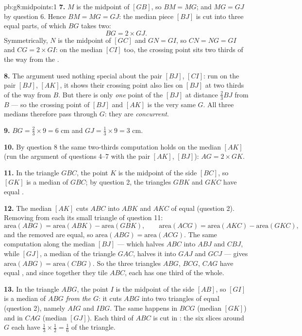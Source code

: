\begin{solution}{pb:g8:midpoints:1}
\textbf{7.} $M$ is the midpoint of $[GB]$, so $BM = MG$; and
$MG = GJ$ by question 6. Hence $BM = MG = GJ$: the median piece
$[BJ]$ is cut into three equal parts, of which $BG$ takes two:
\[
BG = 2 \times GJ .
\]
Symmetrically, $N$ is the midpoint of $[GC]$ and $GN = GI$, so
$CN = NG = GI$ and $CG = 2 \times GI$: on the median $[CI]$ too,
the crossing point sits two thirds of the way from the .

\textbf{8.} The argument used nothing special about the pair
$[BJ]$, $[CI]$: run on the pair $[BJ]$, $[AK]$, it shows their
crossing point also lies on $[BJ]$ at two thirds of the way from
$B$. But there is only \emph{one} point of the  $[BJ]$ at
distance $\frac23 BJ$ from $B$ --- so the crossing point of
$[BJ]$ and $[AK]$ is the very same $G$. All three medians
therefore pass through $G$: they are \emph{concurrent}.

\textbf{9.} $BG = \frac23 \times 9 = 6$ cm and
$GJ = \frac13 \times 9 = 3$ cm.

\textbf{10.} By question 8 the same two-thirds computation holds
on the median $[AK]$ (run the argument of questions 4--7 with
the pair $[AK]$, $[BJ]$): $AG = 2 \times GK$.

\textbf{11.} In the triangle $GBC$, the point $K$ is the midpoint
of the side $[BC]$, so $[GK]$ is a median of $GBC$; by question
2, the triangles $GBK$ and $GKC$ have equal .

\textbf{12.} The median $[AK]$ cuts $ABC$ into $ABK$ and $AKC$ of
equal  (question 2). Removing from each its small triangle
of question 11:
\[
\text{area}(ABG) = \text{area}(ABK) - \text{area}(GBK),
\qquad
\text{area}(ACG) = \text{area}(AKC) - \text{area}(GKC),
\]
and the removed  are equal, so
$\text{area}(ABG) = \text{area}(ACG)$. The same computation
along the median $[BJ]$ --- which halves $ABC$ into $ABJ$ and
$CBJ$, while $[GJ]$, a median of the triangle $GAC$, halves it
into $GAJ$ and $GCJ$ --- gives
$\text{area}(ABG) = \text{area}(CBG)$. So the three triangles
$ABG$, $BCG$, $CAG$ have equal , and since together they
tile $ABC$, each has  one third of the whole.

\textbf{13.} In the triangle $ABG$, the point $I$ is the midpoint
of the side $[AB]$, so $[GI]$ is a median of $ABG$ \emph{from the
 $G$}: it cuts $ABG$ into two triangles of equal 
(question 2), namely $AIG$ and $IBG$. The same happens in $BCG$
(median $[GK]$) and in $CAG$ (median $[GJ]$). Each third of
$ABC$ is cut in : the six slices around $G$ each have 
$\frac13 \times \frac12 = \frac16$ of the triangle.


\end{solution}
